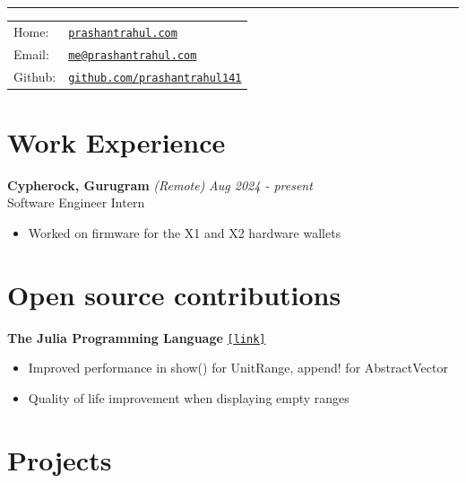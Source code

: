 \documentclass[a4paper,11pt]{article}
\begin{document}
 \vspace{0.5em}

\hrule\vspace{1em}

\noindent
\begin{tabular}{@{}l l}
Home: & \href{https://prashantrahul.com}{\texttt{prashantrahul.com}} \\
Email: & \href{mailto:me@prashantrahul.com}{\texttt{me@prashantrahul.com}} \\
Github: & \href{https://github.com/prashantrahul141}{\texttt{github.com/prashantrahul141}} \\
\end{tabular}

\section*{Work Experience}

\noindent\textbf{Cypherock, Gurugram} \textit{(Remote)} \hfill \textit{Aug 2024 - present}\\
\noindent Software Engineer Intern
\begin{itemize}[noitemsep, topsep=0pt]
    \item Worked on firmware for the X1 and X2 hardware wallets
\end{itemize}


\section*{Open source contributions}

\noindent\textbf{The Julia Programming Language} \hfill \href{https://github.com/JuliaLang/julia/issues?q=author%3Aprashantrahul141}{\texttt{[link]}}
\begin{itemize}[noitemsep, topsep=0pt]
    \item Improved performance in show() for UnitRange, append! for AbstractVector
    \item Quality of life improvement when displaying empty ranges \vspace{0.5em}
\end{itemize}


\section*{Projects}
\end{document}
